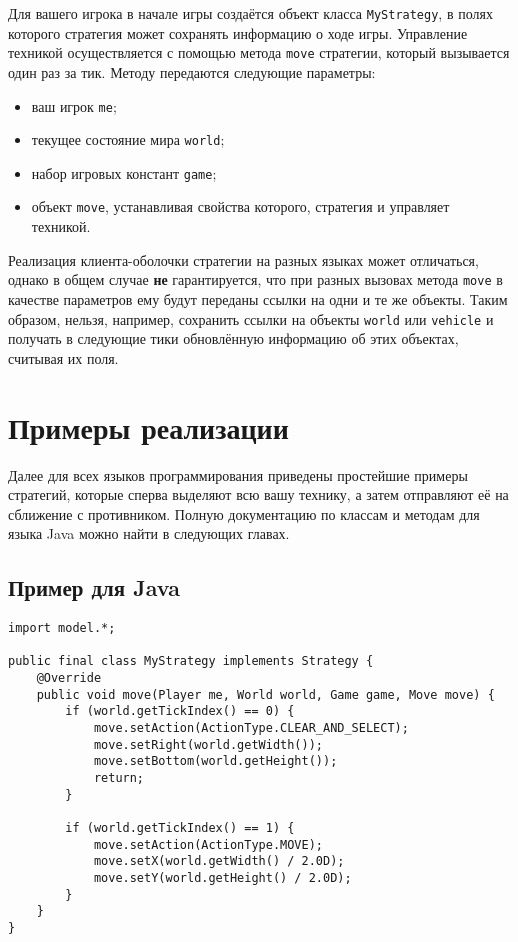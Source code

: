 Для вашего игрока в начале игры создаётся объект класса \texttt{MyStrategy}, в полях которого стратегия может сохранять информацию о ходе
игры. Управление техникой осуществляется с помощью метода \texttt{move} стратегии, который вызывается один раз за тик. Методу передаются
следующие параметры:
\begin{itemize}
  \item ваш игрок \texttt{me};
  \item текущее состояние мира \texttt{world};
  \item набор игровых констант \texttt{game};
  \item объект \texttt{move}, устанавливая свойства которого, стратегия и управляет техникой.
\end{itemize}

Реализация клиента-оболочки стратегии на разных языках может отличаться, однако в общем случае \textbf{не} гарантируется, что при разных
вызовах метода \texttt{move} в качестве параметров ему будут переданы ссылки на одни и те же объекты. Таким образом, нельзя, например,
сохранить ссылки на объекты \texttt{world} или \texttt{vehicle} и получать в следующие тики обновлённую информацию об этих объектах, считывая
их поля.

\newpage
\section{Примеры реализации}

Далее для всех языков программирования приведены простейшие примеры стратегий, которые сперва выделяют всю вашу технику, а затем отправляют
её на сближение с противником. Полную документацию по классам и методам для языка Java можно найти в следующих главах.

\subsection{Пример для Java}

\begin{verbatim}
import model.*;

public final class MyStrategy implements Strategy {
    @Override
    public void move(Player me, World world, Game game, Move move) {
        if (world.getTickIndex() == 0) {
            move.setAction(ActionType.CLEAR_AND_SELECT);
            move.setRight(world.getWidth());
            move.setBottom(world.getHeight());
            return;
        }

        if (world.getTickIndex() == 1) {
            move.setAction(ActionType.MOVE);
            move.setX(world.getWidth() / 2.0D);
            move.setY(world.getHeight() / 2.0D);
        }
    }
}
\end{verbatim}

